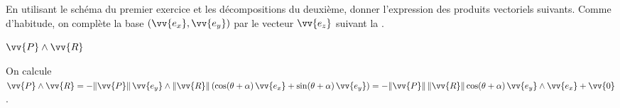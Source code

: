 



\hauteurLargeurCadreReponse		{8mm}{2.7cm}
\initialisationEntrainement

En utilisant le schéma du premier exercice et les décompositions du deuxième, donner l'expression des produits vectoriels suivants. Comme d'habitude, on complète la base $(\vv{e_x}, \vv{e_y})$ par le vecteur $\vv{e_z}$ suivant la .

\debutEntrainement


\begin{enonce}
$\vv{P} \wedge \vv{R}$
\end{enonce}


\begin{corrige}
On calcule $
\vv{P} \wedge \vv{R}
	= -\Arrowvert\vv{P}\Arrowvert\,\vv{e_y}
		\wedge
		\Arrowvert\vv{R}\Arrowvert\left(
			\cos(\theta+\alpha)\,\vv{e_x} + \sin(\theta+\alpha)\,\vv{e_y}
		\right)
	= - \Arrowvert\vv{P}\Arrowvert\,
			\Arrowvert\vv{R}\Arrowvert
			\cos(\theta+\alpha)\,\vv{e_y}\wedge\vv{e_x} + \vv{0}
$.
\end{corrige}





